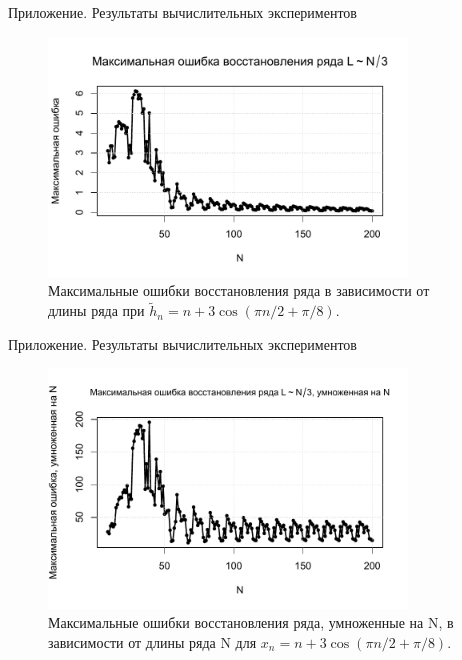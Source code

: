 \documentclass[notheorems, handout]{beamer}
\begin{document}
	\begin{frame}{Приложение. Результаты вычислительных экспериментов}
		\begin{figure}[!h]
			\includegraphics[width=0.85\textwidth]{Pictures/MaxERS.pdf}
			\caption{Максимальные ошибки восстановления ряда в зависимости от длины ряда при $\widetilde{h}_n = n + 3\cos(\pi n/2 + \pi/8)$.}\label{pic:1}
		\end{figure}
	\end{frame}
	\begin{frame}{Приложение. Результаты вычислительных экспериментов}
		\begin{figure}[!h]
			\includegraphics[width=0.85\textwidth]{Pictures/MaxERSNo.pdf}
			\caption{Максимальные ошибки восстановления ряда, умноженные на N, в зависимости от длины ряда N для $x_n = n + 3\cos(\pi n/2 + \pi/8)$.}\label{pic:2}
		\end{figure}
	\end{frame}
	
\end{document}
